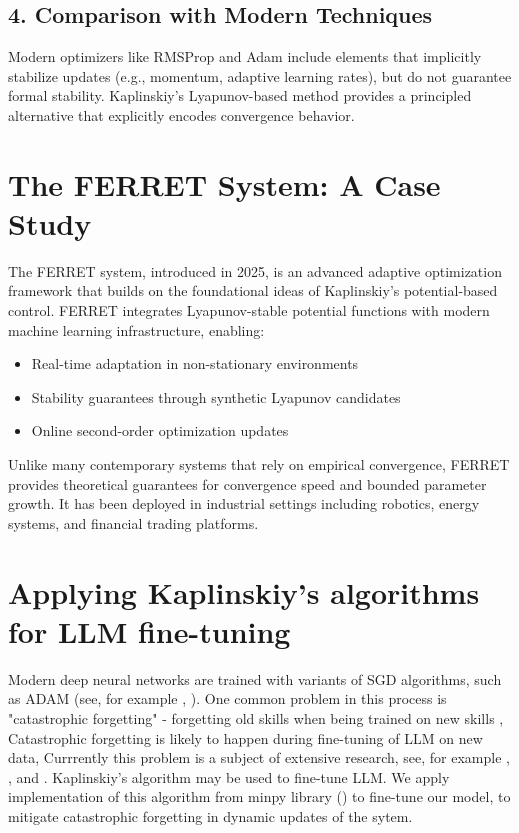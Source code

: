 \documentclass[12pt]{article}
\begin{document}
\subsection*{4. Comparison with Modern Techniques}
Modern optimizers like RMSProp and Adam include elements that implicitly stabilize updates (e.g., momentum, adaptive learning rates), but do not guarantee formal stability. Kaplinskiy's Lyapunov-based method provides a principled alternative that explicitly encodes convergence behavior.

\section{The FERRET System: A Case Study}
The FERRET system, introduced in 2025, is an advanced adaptive optimization framework that builds on the foundational ideas of Kaplinskiy's potential-based control. FERRET integrates Lyapunov-stable potential functions with modern machine learning infrastructure, enabling:
\begin{itemize}
\item Real-time adaptation in non-stationary environments
\item Stability guarantees through synthetic Lyapunov candidates
\item Online second-order optimization updates
\end{itemize}
Unlike many contemporary systems that rely on empirical convergence, FERRET provides theoretical guarantees for convergence speed and bounded parameter growth. It has been deployed in industrial settings including robotics, energy systems, and financial trading platforms.

\section{Applying Kaplinskiy's algorithms for LLM fine-tuning}

Modern deep neural networks are trained with variants of SGD algorithms, such as  ADAM (see, for example \cite{ZMBVK}, \cite{GSM}). One common problem in this process is "catastrophic forgetting" - forgetting old skills when being trained on new skills \cite{VSK}, Catastrophic forgetting is likely to happen during fine-tuning of  LLM  on new data,  Currrently this problem is a subject of extensive research, see, for example , \cite{LMLZ} , \cite{LDFT} and \cite{KSR}.  Kaplinskiy's algorithm may be used to fine-tune LLM. We apply implementation of this algorithm from minpy library (\cite{MP}) to fine-tune our model, to mitigate catastrophic forgetting in dynamic updates of the sytem. 
\end{document}

